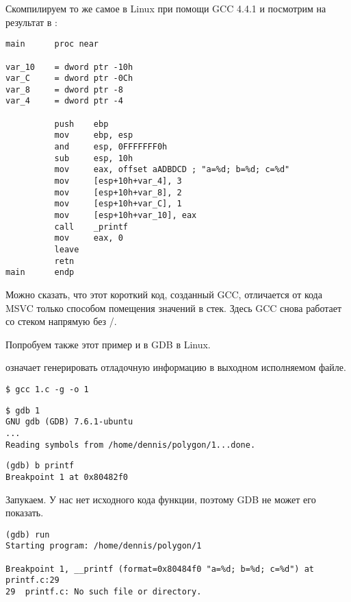 
Скомпилируем то же самое в Linux при помощи GCC 4.4.1 и посмотрим на результат в \IDA:

\begin{lstlisting}[style=customasm]
main      proc near

var_10    = dword ptr -10h
var_C     = dword ptr -0Ch
var_8     = dword ptr -8
var_4     = dword ptr -4

          push    ebp
          mov     ebp, esp
          and     esp, 0FFFFFFF0h
          sub     esp, 10h
          mov     eax, offset aADBDCD ; "a=%d; b=%d; c=%d"
          mov     [esp+10h+var_4], 3
          mov     [esp+10h+var_8], 2
          mov     [esp+10h+var_C], 1
          mov     [esp+10h+var_10], eax
          call    _printf
          mov     eax, 0
          leave
          retn
main      endp
\end{lstlisting}

Можно сказать, что этот короткий код, созданный GCC, отличается от кода MSVC только способом помещения 
значений в стек.
Здесь GCC снова работает со стеком напрямую без \PUSH/\POP.


Попробуем также этот пример и в \ac{GDB} в Linux.

 означает генерировать отладочную информацию в выходном исполняемом файле.

\begin{lstlisting}
$ gcc 1.c -g -o 1
\end{lstlisting}

\begin{lstlisting}
$ gdb 1
GNU gdb (GDB) 7.6.1-ubuntu
...
Reading symbols from /home/dennis/polygon/1...done.
\end{lstlisting}

\begin{lstlisting}[caption=установим точку останова на \printf]
(gdb) b printf
Breakpoint 1 at 0x80482f0
\end{lstlisting}

Запукаем.
У нас нет исходного кода функции, поэтому \ac{GDB} не может его показать.

\begin{lstlisting}
(gdb) run
Starting program: /home/dennis/polygon/1 

Breakpoint 1, __printf (format=0x80484f0 "a=%d; b=%d; c=%d") at printf.c:29
29	printf.c: No such file or directory.
\end{lstlisting}

